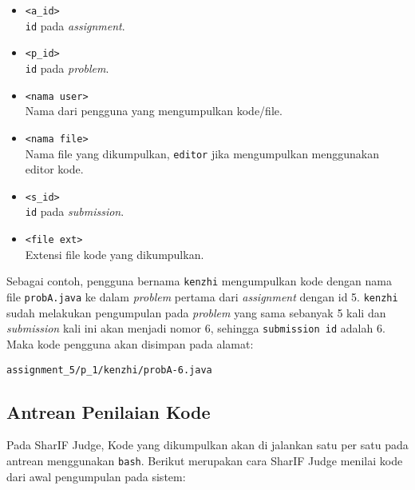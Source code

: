 \begin{itemize}
      \item \verb|<a_id>| \\
            \verb|id| pada \textit{assignment}.
      \item \verb|<p_id>| \\
            \verb|id| pada \textit{problem}.
      \item \verb|<nama user>| \\
            Nama dari pengguna yang mengumpulkan kode/file.
      \item \verb|<nama file>| \\
            Nama file yang dikumpulkan, \verb|editor| jika mengumpulkan menggunakan editor kode.
      \item \verb|<s_id>| \\
            \verb|id| pada \textit{submission}.
      \item \verb|<file ext>| \\
            Extensi file kode yang dikumpulkan.
\end{itemize}

Sebagai contoh, pengguna bernama \verb|kenzhi| mengumpulkan kode dengan nama file \verb|probA.java| ke dalam \textit{problem} pertama dari \textit{assignment} dengan id 5. \verb|kenzhi| sudah melakukan pengumpulan pada \textit{problem} yang sama sebanyak 5 kali dan \textit{submission} kali ini akan menjadi nomor 6, sehingga \verb|submission id| adalah 6. Maka kode pengguna akan disimpan pada alamat:

\begin{center}
      \verb|assignment_5/p_1/kenzhi/probA-6.java|
\end{center}

\subsection{Antrean Penilaian Kode}
\label{sec:3:1:antreanpenilaiankode}

Pada SharIF Judge, Kode yang dikumpulkan akan di jalankan satu per satu pada antrean menggunakan \verb|bash|. Berikut merupakan cara SharIF Judge menilai kode dari awal pengumpulan pada sistem:


